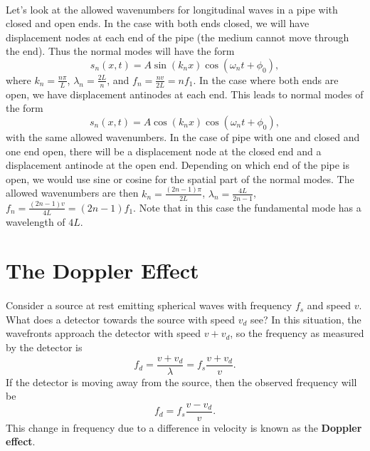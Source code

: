 \documentclass[../classical_mechanics.tex]{subfiles}
\begin{document}
        \paragraph{}
        Let's look at the allowed wavenumbers for longitudinal waves in a pipe with closed and open ends.
        In the case with both ends closed, we will have displacement nodes at each end of the pipe (the medium cannot move through the end).
        Thus the normal modes will have the form
        \begin{equation}
            s_n(x,t)=A\sin(k_n x)\cos(\omega_n t+\phi_0),
        \end{equation}
        where $k_n=\frac{n\pi}{L}$, $\lambda_n=\frac{2L}{n}$, and $f_n=\frac{nv}{2L}=nf_1$.
        In the case where both ends are open, we have displacement antinodes at each end.
        This leads to normal modes of the form
        \begin{equation}
            s_n(x,t)=A\cos(k_n x)\cos(\omega_n t+\phi_0),
        \end{equation}
        with the same allowed wavenumbers.
        In the case of pipe with one and closed and one end open, there will be a displacement node at the closed end and a displacement antinode at the open end.
        Depending on which end of the pipe is open, we would use sine or cosine for the spatial part of the normal modes.
        The allowed wavenumbers are then $k_n=\frac{(2n-1)\pi}{2L}$, $\lambda_n=\frac{4L}{2n-1}$, $f_n=\frac{(2n-1)v}{4L}=(2n-1)f_1$.
        Note that in this case the fundamental mode has a wavelength of $4L$.

    \section{The Doppler Effect}\label{sec:the-doppler-effect}
        \paragraph{}
        Consider a source at rest emitting spherical waves with frequency $f_s$ and speed $v$.
        What does a detector towards the source with speed $v_d$ see?
        In this situation, the wavefronts approach the detector with speed $v+v_d$, so the frequency as measured by the detector is
        \begin{equation}
            f_d=\frac{v+v_d}{\lambda}=f_s\frac{v+v_d}{v}.
        \end{equation}
        If the detector is moving away from the source, then the observed frequency will be
        \begin{equation}
            f_d=f_s\frac{v-v_d}{v}.
        \end{equation}
        This change in frequency due to a difference in velocity is known as the \textbf{Doppler effect}.
\end{document}
